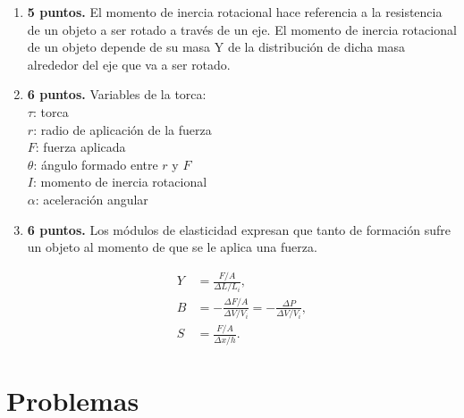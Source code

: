 \documentclass{article}
\begin{document}
\begin{enumerate}
\item \textbf{5 puntos.} El momento de inercia rotacional hace referencia a la resistencia de un
objeto a ser rotado a través de un eje. El momento de inercia rotacional de un
objeto depende de su masa Y de la distribución de dicha masa alrededor del eje
que va a ser rotado.

\item \textbf{6 puntos.} Variables de la torca:\\
$\tau$: torca\\
$r$: radio de aplicación de la fuerza\\
$F$: fuerza aplicada\\
$\theta$: ángulo formado entre $r$ y $F$\\
$I$: momento de inercia rotacional\\
$\alpha$: aceleración angular\\

\item \textbf{6 puntos.} Los módulos de elasticidad expresan que tanto de formación sufre un
objeto al momento de que se le aplica una fuerza.

\begin{align*}
Y &=  \frac{F/A}{\Delta L/L_{i}}, \\
B &= -\frac{\Delta F/A }{\Delta V / V_{i}} 
= -\frac{\Delta P}{\Delta V / V_{i}}, \\
S &=  \frac{F/A}{\Delta x / h}. 
\end{align*}

\end{enumerate}


\section{Problemas} %
\label{sec:secproblemas}
\end{document}
